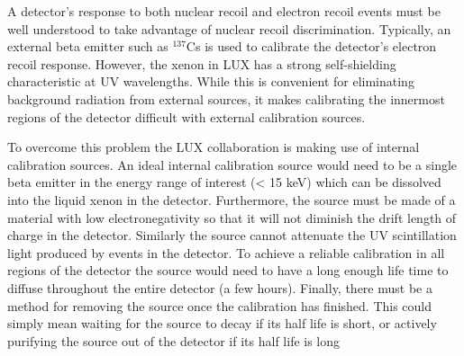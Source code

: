 \documentclass[a4paper,12pt]{article}
\begin{document}
A detector's response to both nuclear recoil and electron recoil events must be well understood to take advantage of nuclear recoil discrimination.  Typically, an external beta emitter such as $^{137}$Cs is used to calibrate the detector's electron recoil response. However, the xenon in LUX has a strong self-shielding characteristic at UV wavelengths. While this is convenient for eliminating background radiation from external sources, it makes calibrating the innermost regions of the detector difficult with external calibration sources.

To overcome this problem the LUX collaboration is making use of internal calibration sources. An ideal internal calibration source would need to be a single beta emitter in the energy range of interest (< 15 keV) which can be dissolved into the liquid xenon in the detector. Furthermore, the source must be made of a material with low electronegativity so that it will not diminish the drift length of charge in the detector. Similarly the source cannot attenuate the UV scintillation light produced by events in the detector. To achieve a reliable calibration in all regions of the detector the source would need to have a long enough life time to diffuse throughout the entire detector (a few hours). Finally, there must be a method for removing the source once the calibration has finished. This could simply mean waiting for the source to decay if its half life is short, or actively purifying the source out of the detector if its half life is long
\end{document}
